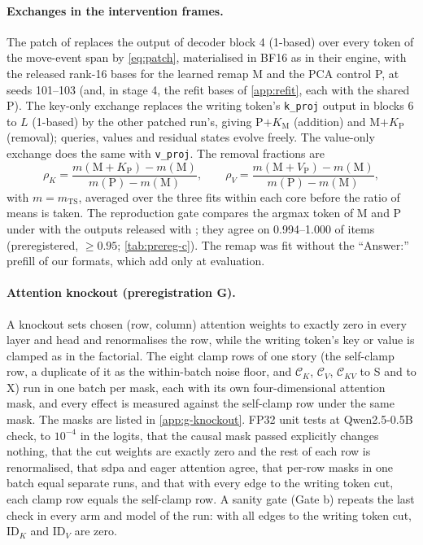 \paragraph{Exchanges in the intervention frames.} The patch of \citet{anonymous2026fitted} replaces the output of decoder block 4 (1-based) over every token of the move-event span by \cref{eq:patch}, materialised in BF16 as in their engine, with the released rank-16 bases for the learned remap M and the PCA control P, at seeds 101--103 (and, in stage 4, the refit bases of \cref{app:refit}, each with the shared P). The key-only exchange replaces the writing token's \texttt{k\_proj} output in blocks 6 to $L$ (1-based) by the other patched run's, giving P$+K_{\mathrm{M}}$ (addition) and M$+K_{\mathrm{P}}$ (removal); queries, values and residual states evolve freely. The value-only exchange does the same with \texttt{v\_proj}. The removal fractions are
\begin{equation*}
\rho_K = \frac{m(\mathrm{M}{+}K_{\mathrm{P}}) - m(\mathrm{M})}{m(\mathrm{P}) - m(\mathrm{M})}, \qquad
\rho_V = \frac{m(\mathrm{M}{+}V_{\mathrm{P}}) - m(\mathrm{M})}{m(\mathrm{P}) - m(\mathrm{M})},
\end{equation*}
with $m = m_{\mathrm{TS}}$, averaged over the three fits within each core before the ratio of means is taken. The reproduction gate compares the argmax token of M and P under \fmtOpt{} with the outputs released with \citet{anonymous2026fitted}; they agree on 0.994--1.000 of items (preregistered, $\geq 0.95$; \cref{tab:prereg-c}). The remap was fit without the ``Answer:'' prefill of our formats, which \citet{anonymous2026fitted} add only at evaluation.

\paragraph{Attention knockout (preregistration G).} A knockout sets chosen (row, column) attention weights to exactly zero in every layer and head and renormalises the row, while the writing token's key or value is clamped as in the factorial. The eight clamp rows of one story (the self-clamp row, a duplicate of it as the within-batch noise floor, and $\mathcal{C}_K$, $\mathcal{C}_V$, $\mathcal{C}_{KV}$ to S and to X) run in one batch per mask, each with its own four-dimensional attention mask, and every effect is measured against the self-clamp row under the same mask. The masks are listed in \cref{app:g-knockout}. FP32 unit tests at Qwen2.5-0.5B check, to $10^{-4}$ in the logits, that the causal mask passed explicitly changes nothing, that the cut weights are exactly zero and the rest of each row is renormalised, that sdpa and eager attention agree, that per-row masks in one batch equal separate runs, and that with every edge to the writing token cut, each clamp row equals the self-clamp row. A sanity gate (Gate b) repeats the last check in every arm and model of the run: with all edges to the writing token cut, $\mathrm{ID}_K$ and $\mathrm{ID}_V$ are zero.

